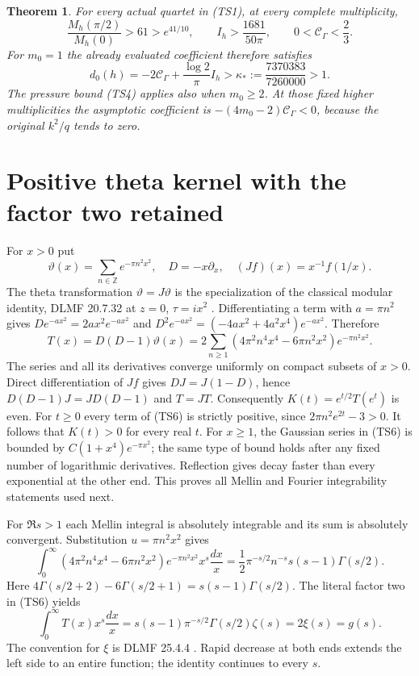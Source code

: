 \documentclass[11pt]{article}
\newtheorem{theorem}{Theorem}
\begin{document}
\begin{theorem}\label{th:sign}
For every actual quartet in (TS1), at every complete multiplicity,
\begin{equation}\tag{TS4}
 \frac{M_h(\pi/2)}{M_h(0)}>61>e^{41/10},\qquad
 I_h>\frac{1681}{50\pi},\qquad 0<\mathcal C_\Gamma<\frac23.
\end{equation}
For $m_0=1$ the already evaluated coefficient therefore satisfies
\begin{equation}\tag{TS5}
 d_0(h)=-2\mathcal C_\Gamma+\frac{\log2}{\pi}I_h
 >\kappa_*:=\frac{7370383}{7260000}>1.
\end{equation}
The pressure bound (TS4) applies also when $m_0\geq2$.
At those fixed higher multiplicities the asymptotic coefficient is
$-(4m_0-2)\mathcal C_\Gamma<0$, because the original $k^2/q$ tends to zero.
\end{theorem}

\section{Positive theta kernel with the factor two retained}
For $x>0$ put
\[
 \vartheta(x)=\sum_{n\in\mathbb Z}e^{-\pi n^2x^2},\quad
 D=-x\partial_x,\quad (Jf)(x)=x^{-1}f(1/x).
\]
The theta transformation $\vartheta=J\vartheta$ is the specialization
of the classical modular identity, DLMF 20.7.32 at $z=0$,
$\tau=ix^2$ \cite{theta}. Differentiating a term with $a=\pi n^2$
gives $D e^{-ax^2}=2ax^2e^{-ax^2}$ and
$D^2e^{-ax^2}=(-4ax^2+4a^2x^4)e^{-ax^2}$. Therefore
\begin{equation}\tag{TS6}
 T(x)=D(D-1)\vartheta(x)
 =2\sum_{n\geq1}(4\pi^2n^4x^4-6\pi n^2x^2)e^{-\pi n^2x^2}.
\end{equation}
The series and all its derivatives converge uniformly on compact
subsets of $x>0$. Direct differentiation of $Jf$ gives
$DJ=J(1-D)$, hence $D(D-1)J=JD(D-1)$ and $T=JT$.
Consequently $K(t)=e^{t/2}T(e^t)$ is even. For $t\geq0$ every term
of (TS6) is strictly positive, since $2\pi n^2e^{2t}-3>0$.
It follows that $K(t)>0$ for every real $t$. For $x\geq1$, the
Gaussian series in (TS6) is bounded by $C(1+x^4)e^{-\pi x^2}$;
the same type of bound holds after any fixed number of logarithmic
derivatives. Reflection gives decay faster than every exponential
at the other end. This proves all Mellin and Fourier integrability
statements used next.

For $\Re s>1$ each Mellin integral is absolutely integrable and its
sum is absolutely convergent. Substitution $u=\pi n^2x^2$ gives
\[
 \int_0^\infty(4\pi^2n^4x^4-6\pi n^2x^2)e^{-\pi n^2x^2}x^s\frac{dx}{x}
 =\frac12\pi^{-s/2}n^{-s}s(s-1)\Gamma(s/2).
\]
Here $4\Gamma(s/2+2)-6\Gamma(s/2+1)=s(s-1)\Gamma(s/2)$.
The literal factor two in (TS6) yields
\begin{equation}\tag{TS7}
 \int_0^\infty T(x)x^s\frac{dx}{x}
 =s(s-1)\pi^{-s/2}\Gamma(s/2)\zeta(s)=2\xi(s)=g(s).
\end{equation}
The convention for $\xi$ is DLMF 25.4.4 \cite{zeta}.
Rapid decrease at both ends extends the left side to an entire
function; the identity continues to every $s$.
\end{document}

